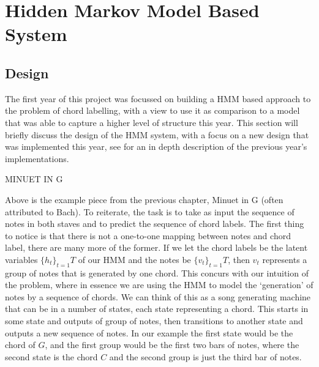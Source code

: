 \documentclass[bsc,singlespacing,logo, parskip, deptreport]{infthesis}
\begin{document}
\section{Hidden Markov Model Based System}
\subsection{Design} \label{HMM DES}

The first year of this project was focussed on building a HMM based approach to the problem of chord labelling, with a view to use it as comparison to a model that was able to capture a higher level of structure this year. This section will briefly discuss the design of the HMM system, with a focus on a new design that was implemented this year, see \cite{self} for an in depth description of the previous year's implementations.

MINUET IN G

Above is the example piece from the previous chapter, Minuet in G (often attributed to Bach). To reiterate, the task is to take as input the sequence of notes in both staves and to predict the sequence of chord labels. The first thing to notice is that there is not a one-to-one mapping between notes and chord label, there are many more of the former. If we let the chord labels be the latent variables $\{h_t\}_{t=1}{T}$ of our HMM and the notes be $\{v_t\}_{t=1}{T}$, then $v_t$ represents a group of notes that is generated by one chord. This concurs with our intuition of the problem, where in essence we are using the HMM to model the `generation' of notes by a sequence of chords. We can think of this as a song generating machine that can be in a number of states, each state representing a chord. This starts in some state and outputs of group of notes, then transitions to another state and outputs a new sequence of notes. In our example the first state would be the chord of $G$, and the first group would be the first two bars of notes, where the second state is the chord $C$ and the second group is just the third bar of notes.
\end{document}
